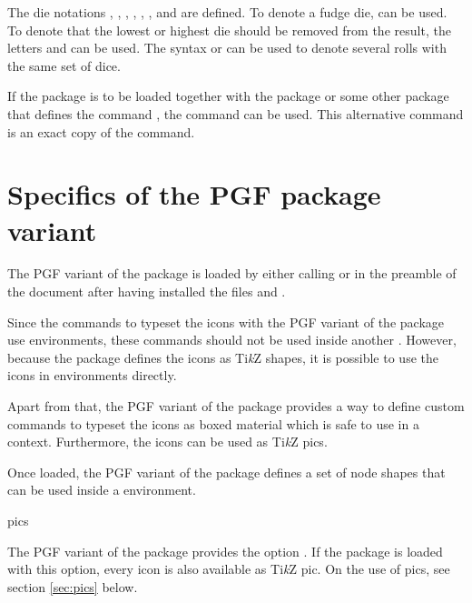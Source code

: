 \documentclass[a4paper]{article}
\begin{document}
The die notations , , , , , ,  and  are defined. To denote a fudge die,  can be used. To denote that the lowest or highest die should be removed from the result, the letters  and  can be used. The syntax  or  can be used to denote several rolls with the same set of dice.

If the  package is to be loaded together with the  package or some other package that defines the command \macro{\roll}, the command \macro{\DndiconsRoll} can be used. This alternative command is an exact copy of the \macro{\roll} command. 


\RenewCommandCopy\die\dndiconsdie
\RenewCommandCopy\ability\dndiconsability

\section{Specifics of the PGF package variant}

The PGF variant of the package is loaded by either calling \macro{\usepackage[pgf]{dndicons}} or \macro{\usepackage{dndicons-pgf}} in the preamble of the document after having installed the files  and . 

Since the commands to typeset the icons with the PGF variant of the package use  environments, these commands should not be used inside another . However, because the package defines the icons as Ti\emph{k}Z shapes, it is possible to use the icons in  environments directly. 

Apart from that, the PGF variant of the package provides a way to define custom commands to typeset the icons as boxed material which is safe to use in a  context. Furthermore, the icons can be used as Ti\emph{k}Z pics. 

Once loaded, the PGF variant of the package defines a set of node shapes that can be used inside a  environment. 

\begin{macrodef}pics\end{macrodef}
The PGF variant of the package provides the option . If the package is loaded with this option, every icon is also available as Ti\emph{k}Z pic. On the use of pics, see section \ref{sec:pics} below.
\end{document}
